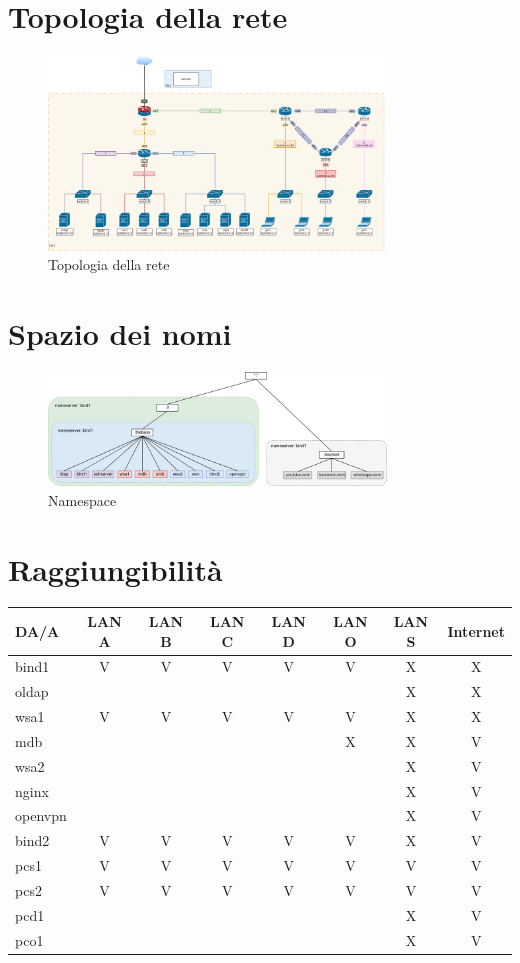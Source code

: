 \documentclass[a4paper,12pt]{article}
\begin{document}
\section{Topologia della rete} \label{2-topologia-della-rete}
\begin{figure}[H]
    \centering
    \includegraphics[width=0.8\textwidth]{img/network.drawio.png}
    \caption{Topologia della rete}
\end{figure}

\section{Spazio dei nomi} \label{3-spazio-dei-nomi}
\begin{figure}[H]
    \centering
    \includegraphics[width=0.8\textwidth]{img/namespace.drawio.png}
    \caption{Namespace}
\end{figure}

\section{Raggiungibilità} \label{4-raggiungibilità}
\begin{longtable}{lccccccc}
\toprule
DA/A & LAN A & LAN B & LAN C & LAN D & LAN O & LAN S & Internet \\
\midrule
bind1 & V & V & V & V & V & X & X \\
oldap &   &   &   &   &   & X & X \\
wsa1  & V & V & V & V & V & X & X \\
mdb   &   &   &   &   & X & X & V \\
wsa2  &   &   &   &   &   & X & V \\
nginx &   &   &   &   &   & X & V \\
openvpn & &  &  &  &  & X & V \\
bind2 & V & V & V & V & V & X & V \\
pcs1  & V & V & V & V & V & V & V \\
pcs2  & V & V & V & V & V & V & V \\
pcd1  &   &   &   &   &   & X & V \\
pco1  &   &   &   &   &   & X & V \\
\bottomrule
\end{longtable}
\end{document}
